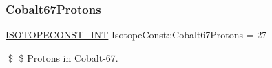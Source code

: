\subsubsection{\texorpdfstring{Cobalt67\+Protons}{Cobalt67Protons}}
{\footnotesize\ttfamily \mbox{\hyperlink{group___isotope_const-_macros_ga5f18360b3e99483a35c32d789e62621c}{I\+S\+O\+T\+O\+P\+E\+C\+O\+N\+S\+T\+\_\+\+I\+NT}} Isotope\+Const\+::\+Cobalt67\+Protons = 27}

\$ \$ Protons in Cobalt-\/67. 